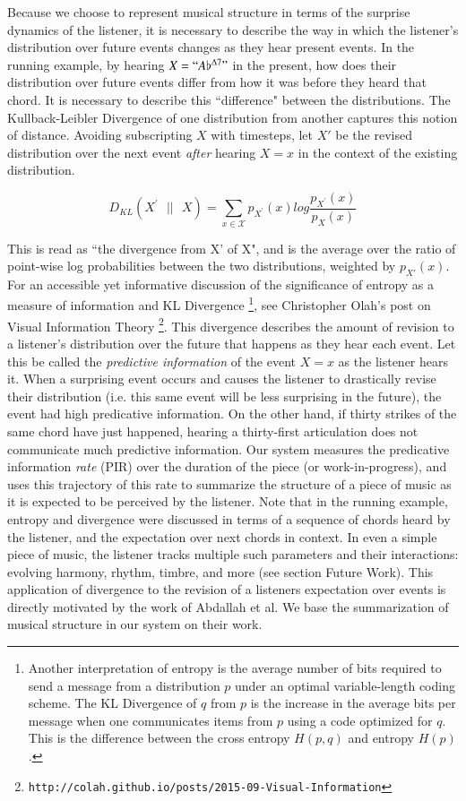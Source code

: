 \documentclass[final,authoryear,5p,times,twocolumn]{elsarticle}
\begin{document}
Because we choose to represent musical structure in terms of the surprise dynamics of the listener, it is necessary to describe the way in which the listener's distribution over future events changes as they hear present events. In the running example, by hearing $X=``A\flat^{\Delta7}"$ in the present, how does their distribution over future events differ from how it was before they heard that chord. It is necessary to describe this ``difference" between the distributions. The Kullback-Leibler Divergence of one distribution from another captures this notion of distance. Avoiding subscripting $X$ with timesteps, let  $X'$ be the revised distribution over the next event \textit{after} hearing $X=x$ in the context of the existing distribution.

$$ D_{KL}(X^{\prime}\textrm{ }|| \textrm{ } X) =  \sum_{x \in \mathcal{X}} p_{X^{\prime}}(x) log\frac{p_{X^{\prime}}(x) }{p_{X}(x)}$$

\noindent This is read as ``the divergence from X' of X", and is the average over the ratio of point-wise log probabilities between the two distributions, weighted by $p_{X'}(x)$. For an accessible yet informative discussion of the significance of entropy as a measure of information and KL Divergence  \footnote{Another interpretation of entropy is the average number of bits required to send a message from a distribution $p$ under an optimal variable-length coding scheme. The KL Divergence of $q$ from $p$ is the increase in the average bits per message when one communicates items from $p$ using a code optimized for $q$. This is the difference between the cross entropy $H(p,q)$ and entropy $H(p)$.}, see Christopher Olah's post on Visual Information Theory \footnote{\texttt{http://colah.github.io/posts/2015-09-Visual-Information}}. This divergence describes the amount of revision to a listener's distribution over the future that happens as they hear each event. Let this be called the \textit{predictive information} of the event $X=x$ as the listener hears it. When a surprising event occurs and causes the listener to drastically revise their distribution (i.e. this same event will be less surprising in the future), the event had high predicative information. On the other hand, if thirty strikes of the same chord have just happened, hearing a thirty-first articulation does not communicate much predictive information. Our system measures the predicative information \textit{rate} (PIR) over the duration of the piece (or work-in-progress), and uses this trajectory of this rate to summarize the structure of a piece of music as it is expected to be perceived by the listener. Note that in the running example, entropy and divergence were discussed in terms of a sequence of chords heard by the listener, and the expectation over next chords in context. In even a simple piece of music, the listener tracks multiple such parameters and their interactions: evolving harmony, rhythm, timbre, and more (see section Future Work). This application of divergence to the revision of a listeners expectation over events is directly motivated by the work of  Abdallah et al. We base the summarization of musical structure in our system on their work.
\end{document}
